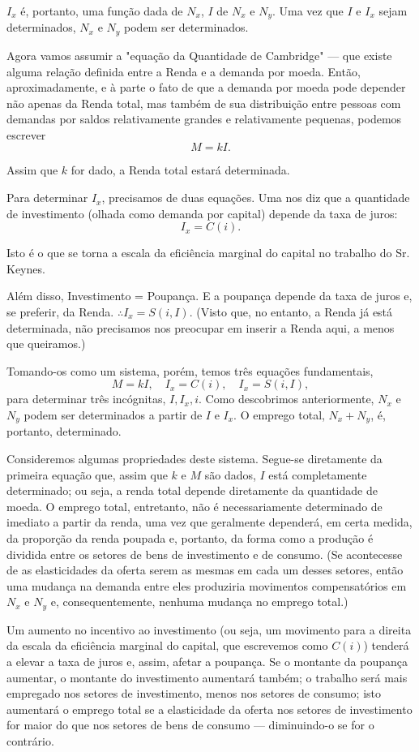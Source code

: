 \documentclass[12pt]{article}
\begin{document}
$I_x$ é, portanto, uma função dada de $N_x$, $I$ de $N_x$ e $N_y$. Uma vez que $I$ e $I_x$ sejam determinados, $N_x$ e $N_y$ podem ser determinados.

Agora vamos assumir a "equação da Quantidade de Cambridge" — que existe alguma relação definida entre a Renda e a demanda por moeda. Então, aproximadamente, e à parte o fato de que a demanda por moeda pode depender não apenas da Renda total, mas também de sua distribuição entre pessoas com demandas por saldos relativamente grandes e relativamente pequenas, podemos escrever
\[ M = kI. \]

Assim que $k$ for dado, a Renda total estará determinada.

Para determinar $I_x$, precisamos de duas equações. Uma nos diz que a quantidade de investimento (olhada como demanda por capital) depende da taxa de juros:
\[ I_x = C(i). \]

Isto é o que se torna a escala da eficiência marginal do capital no trabalho do Sr. Keynes.

Além disso, Investimento = Poupança. E a poupança depende da taxa de juros e, se preferir, da Renda. $\therefore I_x = S(i, I)$. (Visto que, no entanto, a Renda já está determinada, não precisamos nos preocupar em inserir a Renda aqui, a menos que queiramos.)

Tomando-os como um sistema, porém, temos três equações fundamentais,
\[ M = kI, \quad I_x = C(i), \quad I_x = S(i, I), \]
para determinar três incógnitas, $I, I_x, i$. Como descobrimos anteriormente, $N_x$ e $N_y$ podem ser determinados a partir de $I$ e $I_x$. O emprego total, $N_x + N_y$, é, portanto, determinado.

Consideremos algumas propriedades deste sistema. Segue-se diretamente da primeira equação que, assim que $k$ e $M$ são dados, $I$ está completamente determinado; ou seja, a renda total depende diretamente da quantidade de moeda. O emprego total, entretanto, não é necessariamente determinado de imediato a partir da renda, uma vez que geralmente dependerá, em certa medida, da proporção da renda poupada e, portanto, da forma como a produção é dividida entre os setores de bens de investimento e de consumo. (Se acontecesse de as elasticidades da oferta serem as mesmas em cada um desses setores, então uma mudança na demanda entre eles produziria movimentos compensatórios em $N_x$ e $N_y$ e, consequentemente, nenhuma mudança no emprego total.)

Um aumento no incentivo ao investimento (ou seja, um movimento para a direita da escala da eficiência marginal do capital, que escrevemos como $C(i)$) tenderá a elevar a taxa de juros e, assim, afetar a poupança. Se o montante da poupança aumentar, o montante do investimento aumentará também; o trabalho será mais empregado nos setores de investimento, menos nos setores de consumo; isto aumentará o emprego total se a elasticidade da oferta nos setores de investimento for maior do que nos setores de bens de consumo — diminuindo-o se for o contrário.
\end{document}
